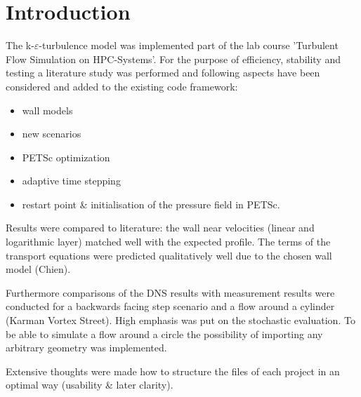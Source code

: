 \chapter{Introduction} %
\label{cha:introduction}



The k-$\varepsilon$-turbulence model was implemented part of the lab course 'Turbulent Flow Simulation on HPC-Systems'. For the purpose of efficiency, stability and testing a literature study was performed and following aspects have been considered and added to the existing code framework:

\begin{itemize}
\item wall models
\item new scenarios
\item PETSc optimization
\item adaptive time stepping
\item restart point \& initialisation of the pressure field in PETSc.
\end{itemize}

\noi Results were compared to literature: the wall near velocities (linear and logarithmic layer) matched well with the expected profile. The terms of the transport equations were predicted qualitatively well due to the chosen wall model (Chien).

\noii Furthermore comparisons of the DNS results with measurement results were conducted for a backwards facing step scenario and a flow around a cylinder (Karman Vortex Street).
High emphasis was put on the stochastic evaluation. To be able to simulate a flow around a circle the possibility of importing any arbitrary geometry was implemented.

\noii Extensive thoughts were made how to structure the files of each project in an optimal way (usability \& later clarity).

